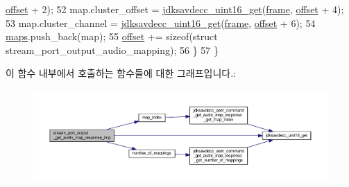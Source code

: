 \begin{DoxyCode}
      \hyperlink{classavdecc__lib_1_1stream__port__output__get__audio__map__response__imp_aadb6d6eb83e646653a1402032e45dcab}{offset} + 2);
52         map.cluster\_offset = \hyperlink{group__endian_ga3fbbbc20be954aa61e039872965b0dc9}{jdksavdecc\_uint16\_get}(\hyperlink{gst__avb__playbin_8c_ac8e710e0b5e994c0545d75d69868c6f0}{frame}, 
      \hyperlink{classavdecc__lib_1_1stream__port__output__get__audio__map__response__imp_aadb6d6eb83e646653a1402032e45dcab}{offset} + 4);
53         map.cluster\_channel = \hyperlink{group__endian_ga3fbbbc20be954aa61e039872965b0dc9}{jdksavdecc\_uint16\_get}(\hyperlink{gst__avb__playbin_8c_ac8e710e0b5e994c0545d75d69868c6f0}{frame}, 
      \hyperlink{classavdecc__lib_1_1stream__port__output__get__audio__map__response__imp_aadb6d6eb83e646653a1402032e45dcab}{offset} + 6);
54         \hyperlink{classavdecc__lib_1_1stream__port__output__get__audio__map__response__imp_a973b7d4514c80489a2d8bf42114bb799}{maps}.push\_back(map);
55         \hyperlink{classavdecc__lib_1_1stream__port__output__get__audio__map__response__imp_aadb6d6eb83e646653a1402032e45dcab}{offset} += \textcolor{keyword}{sizeof}(\textcolor{keyword}{struct }stream\_port\_output\_audio\_mapping);
56     \}
57 \}
\end{DoxyCode}


이 함수 내부에서 호출하는 함수들에 대한 그래프입니다.\+:
\nopagebreak
\begin{figure}[H]
\begin{center}
\leavevmode
\includegraphics[width=350pt]{classavdecc__lib_1_1stream__port__output__get__audio__map__response__imp_aa1d6387589507c7969b74d8a72943106_cgraph}
\end{center}
\end{figure}


